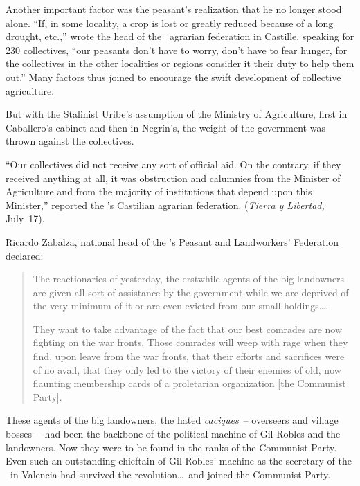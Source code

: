 Another important factor was the peasant’s realization that he no longer stood alone. ``If, in some locality, a crop is lost or greatly reduced because of a long drought, etc.,\kn\kn''
wrote the head of the \CNT\ agrarian federation in Castille, speaking for 230 collectives, ``our peasants don’t have to worry, don’t have to fear hunger, for the collectives in the other localities or regions consider it their duty to help them out.\kn\kn'' Many factors thus joined to encourage the swift development of collective agriculture.

But with the Stalinist Uribe’s assumption of the Ministry of Agriculture, first in Caballero’s cabinet and then in Negr\'in’s, the weight of the government was thrown against the collectives.

``Our collectives did not receive any sort of official aid. On the contrary, if they received anything at all, it was obstruction and calumnies from the Minister of Agriculture and from the majority of institutions that depend upon this Minister,'' reported the \CNT’s Castilian agrarian federation. (\emph{Tierra y Libertad,} July~17).

\medskip

Ricardo Zabalza, national head of the \UGT’s Peasant and Land\-work\-ers’ Federation declared:

\begin{quotation}
  The reactionaries of yesterday, the erstwhile agents of the big landowners are given all sort of assistance by the government while we are deprived of the very minimum of it or are even evicted from our small holdings\dots.
  
  They want to take advantage of the fact that our best comrades are now fighting on the war fronts. Those comrades will weep with rage when they find, upon leave from the war fronts, that their efforts and sacrifices were of no avail, that they only led to the victory of their enemies of old, now flaunting membership cards of a proletarian organization [the Communist Party].
\end{quotation}

These agents of the big landowners, the hated \emph{caciques}~-- overseers and village bosses~-- had been the backbone of the political machine of Gil-Robles and the landowners. Now they were to be found in the ranks of the Communist Party. Even such an outstanding chieftain of Gil-Robles’ machine as the secretary of the \CEDA\ in Valencia had survived the revolution\dots\ and joined the Communist Party.

